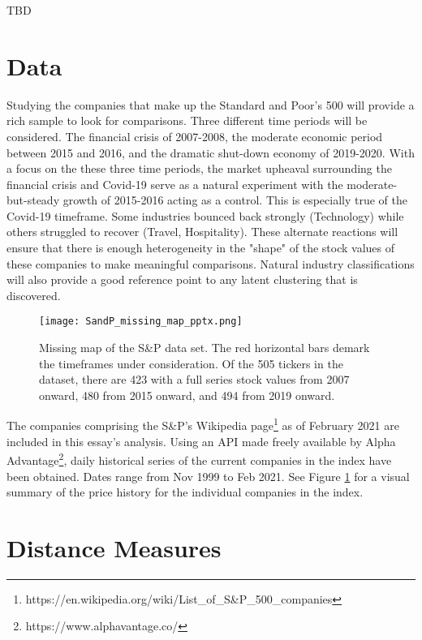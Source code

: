 \documentclass[12pt]{article}
\begin{document}
\parencite{WangXieHanSun2012} TBD

\section{Data}

Studying the companies that make up the Standard and Poor's 500 will provide a rich sample to look for comparisons. Three different time periods will be considered. The financial crisis of 2007-2008, the moderate economic period between 2015 and 2016, and the dramatic shut-down economy of 2019-2020. With a focus on the these three time periods, the market upheaval surrounding the financial crisis and Covid-19 serve as a natural experiment with the moderate-but-steady growth of 2015-2016 acting as a control. This is especially true of the Covid-19 timeframe. Some industries bounced back strongly (Technology) while others struggled to recover (Travel, Hospitality). These alternate reactions will ensure that there is enough heterogeneity in the "shape" of the stock values of these companies to make meaningful comparisons. Natural industry classifications will also provide a good reference point to any latent clustering that is discovered.

\begin{figure}
    \centering
    \texttt{[image: SandP\_missing\_map\_pptx.png]}
    \caption{Missing map of the S\&P data set. The red horizontal bars demark the timeframes under consideration. Of the 505 tickers in the dataset, there are 423 with a full series stock values from 2007 onward, 480 from 2015 onward, and 494 from 2019 onward.}
    \label{fig:SandP_missing_map}
\end{figure}

The companies comprising the S\&P's Wikipedia page\footnote{https://en.wikipedia.org/wiki/List\_of\_S\&P\_500\_companies} as of February 2021 are included in this essay's analysis. Using an API made freely available by Alpha Advantage\footnote{https://www.alphavantage.co/}, daily historical series of the current companies in the index have been obtained. Dates range from Nov 1999 to Feb 2021. See Figure \ref{fig:SandP_missing_map} for a visual summary of the price history for the individual companies in the index.

\pagebreak

\section{Distance Measures}
\end{document}
